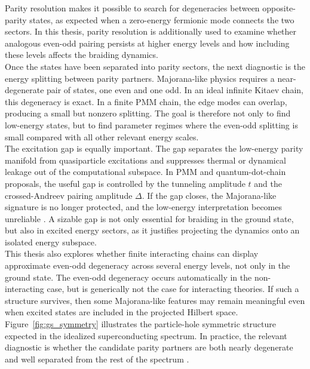 Parity resolution makes it possible to search for degeneracies between opposite-parity states, as expected when a zero-energy fermionic mode connects the two sectors. In this thesis, parity resolution is additionally used to examine whether analogous even-odd pairing persists at higher energy levels and how including these levels affects the braiding dynamics.\\ 

Once the states have been separated into parity sectors, the next diagnostic is the energy splitting between parity partners. Majorana-like physics requires a near-degenerate pair of states, one even and one odd. In an ideal infinite Kitaev chain, this degeneracy is exact. In a finite PMM chain, the edge modes can overlap, producing a small but nonzero splitting. The goal is therefore not only to find low-energy states, but to find parameter regimes where the even-odd splitting is small compared with all other relevant energy scales.\\

The excitation gap is equally important. The gap separates the low-energy parity manifold from quasiparticle excitations and suppresses thermal or dynamical leakage out of the computational subspace. In PMM and quantum-dot-chain proposals, the useful gap is controlled by the tunneling amplitude $t$ and the crossed-Andreev pairing amplitude $\Delta$. If the gap closes, the Majorana-like signature is no longer protected, and the low-energy interpretation becomes unreliable \cite{sauRealizingRobustPractical2012}. A sizable gap is not only essential for braiding in the ground state, but also in excited energy sectors, as it justifies projecting the dynamics onto an isolated energy subspace.\\

This thesis also explores whether finite interacting chains can display approximate even-odd degeneracy across several energy levels, not only in the ground state. The even-odd degeneracy occurs automatically in the non-interacting case, but is generically not the case for interacting theories. If such a structure survives, then some Majorana-like features may remain meaningful even when excited states are included in the projected Hilbert space. Figure~\ref{fig:gs_symmetry} illustrates the particle-hole symmetric structure expected in the idealized superconducting spectrum. In practice, the relevant diagnostic is whether the candidate parity partners are both nearly degenerate and well separated from the rest of the spectrum \cite{topocondmatKitaevChain}.

